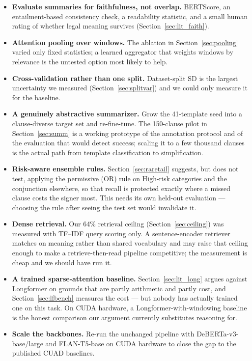 \begin{itemize}[itemsep=2pt]
  \item \textbf{Evaluate summaries for faithfulness, not overlap.} BERTScore, an entailment-based consistency check, a readability statistic, and a small human rating of whether legal meaning survives (Section~\ref{sec:lit_faith}).
  \item \textbf{Attention pooling over windows.} The ablation in Section~\ref{sec:pooling} varied only fixed statistics; a learned aggregator that weights windows by relevance is the untested option most likely to help.
  \item \textbf{Cross-validation rather than one split.} Dataset-split SD is the largest uncertainty we measured (Section~\ref{sec:splitvar}) and we could only measure it for the baseline.
  \item \textbf{A genuinely abstractive summarizer.} Grow the 41-template seed into a clause-diverse target set and re-fine-tune. The 150-clause pilot in Section~\ref{sec:summ} is a working prototype of the annotation protocol and of the evaluation that would detect success; scaling it to a few thousand clauses is the actual path from template classification to simplification.
  \item \textbf{Risk-aware ensemble rules.} Section~\ref{sec:raretail} suggests, but does not test, applying the permissive (OR) rule on High-risk categories and the conjunction elsewhere, so that recall is protected exactly where a missed clause costs the signer most. This needs its own held-out evaluation --- choosing the rule after seeing the test set would invalidate it.
  \item \textbf{Dense retrieval.} Our 64\% retrieval ceiling (Section~\ref{sec:ceiling}) was measured with TF--IDF query scoring only. A sentence-encoder retriever matches on meaning rather than shared vocabulary and may raise that ceiling enough to make a retrieve-then-read pipeline competitive; the measurement is cheap and we should have run it.
  \item \textbf{A trained sparse-attention baseline.} Section~\ref{sec:lit_long} argues against Longformer on grounds that are partly arithmetic and partly cost, and Section~\ref{sec:lfbench} measures the cost --- but nobody has actually trained one on this task. On CUDA hardware, a Longformer-with-windowing baseline is the honest comparison our argument currently substitutes reasoning for.
  \item \textbf{Scale the backbones.} Re-run the unchanged pipeline with DeBERTa-v3-base/large and FLAN-T5-base on CUDA hardware to close the gap to the published CUAD baselines.

\end{itemize}

